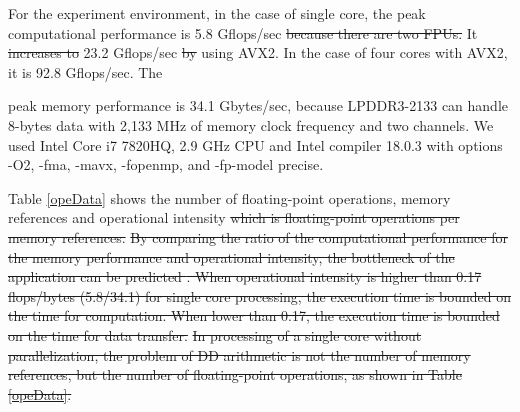 \documentclass{IOS-Book-Article}
\begin{document}
For the experiment environment, in the case of single core, the peak computational performance is 5.8 Gflops/sec \sout{because there are two FPUs.} It \sout{increases to} {\color{blue}{is}} 23.2 Gflops/sec \sout{by} using AVX2. In the case of four cores with AVX2, it is 92.8 Gflops/sec.
The {peak memory performance is 34.1 Gbytes/sec, because LPDDR3-2133 can handle 8-bytes data with 2,133 MHz of memory clock frequency and two channels. We used Intel Core i7 7820HQ, 2.9 GHz CPU and Intel compiler 18.0.3 with options -O2, -fma, -mavx, -fopenmp, and -fp-model precise.

{\color{mur}{The}} {\color{blue}{operational intensity is defined as the number of floating-point operations [flops] / the number of memory references [bytes].}}
Table \ref{opeData} shows the number of floating-point operations, memory references and operational intensity \cite{roof} \sout{which is floating-point operations per memory references.} {\color{mur}{The balance for the computational performance and the memory performance determinesr the factor of the upper bound of performance.}} {} \sout{By comparing the ratio of the computational performance for the memory performance and operational intensity, the bottleneck of the application can be predicted \cite{roof}. When operational intensity is higher than 0.17 flops/bytes (5.8/34.1) for single core processing, the execution time is bounded on the time for computation. When lower than 0.17, the execution time is bounded on the time for data transfer. }
\sout{In processing of a single core without parallelization, the problem of DD arithmetic is not the number of memory references, but the number of floating-point operations, as shown in Table \ref{opeData}.}

}
\end{document}
